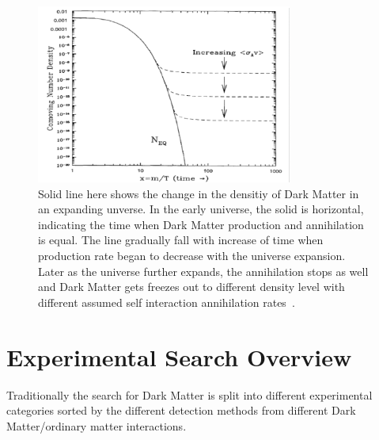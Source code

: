 

\begin{figure}[!htb]
    \begin{center}
        \includegraphics[width=0.75\textwidth]{figures/chapter_DM/WIMP}
        \caption{
            Solid line here shows the change in the densitiy of Dark Matter in an expanding unverse. In the early universe, the solid is horizontal, indicating the time when Dark Matter production and annihilation is equal. The line gradually fall with increase of time when production rate began to decrease with the universe expansion. Later as the universe further expands, the annihilation stops as well and Dark Matter gets freezes out to different density level with different assumed self interaction annihilation rates~\cite{WIMP}.
        }
        \label{fig:WIMP_figure}
    \end{center}
\end{figure}


 



\section{Experimental Search Overview}
\label{section:searches}

Traditionally the search for Dark Matter is split into different experimental categories sorted by the different detection methods from different Dark Matter/ordinary matter interactions. 

